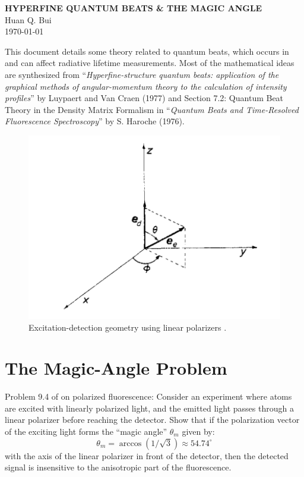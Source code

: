 \documentclass[11pt]{article}
\begin{document}
\begin{center}
\textbf{HYPERFINE QUANTUM BEATS \& THE MAGIC ANGLE}\\

Huan Q. Bui\\
\today
\end{center}

This document details some theory related to quantum beats, which occurs in and can affect radiative lifetime measurements. Most of the mathematical ideas are synthesized from ``\textit{Hyperfine-structure quantum beats: application of the graphical methods of angular-momentum theory to the calculation of intensity profiles}'' by Luypaert and Van Craen (1977) and Section 7.2: Quantum Beat Theory in the Density Matrix Formalism in ``\textit{Quantum Beats and Time-Resolved Fluorescence Spectroscopy}'' by S. Haroche (1976).


\begin{figure}[!htb]
	\centering
	\includegraphics[scale=0.7]{beats_1}
	\caption{ Excitation-detection geometry using linear polarizers \cite{Luypaert_1977}.}
	\label{fig:scheme}
\end{figure}




\section{The Magic-Angle Problem}
Problem 9.4 of \cite{demille_atoms} on polarized fluorescence: Consider an experiment where atoms are excited with linearly polarized light, and the emitted light passes through a linear polarizer before reaching the detector. Show that if the polarization vector of the exciting light forms the ``magic angle'' $\theta_m$ given by:
\begin{equation*}
\theta_m = \arccos(1/\sqrt{3}) \approx 54.74^\circ
\end{equation*}
with the axis of the linear polarizer in front of the detector, then the detected signal is insensitive to the anisotropic part of the fluorescence. 
\end{document}
